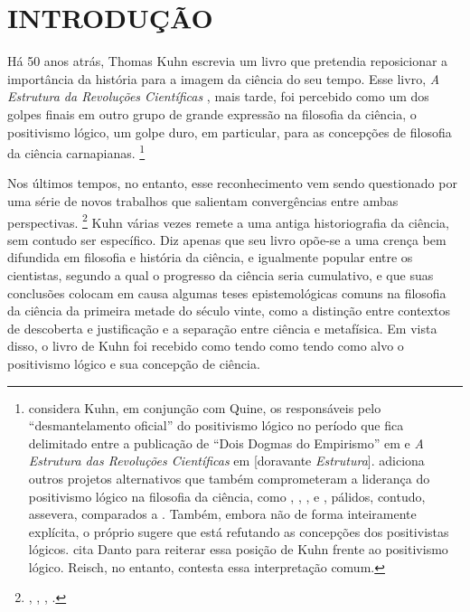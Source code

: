 \setcounter{page}{9}

\chapter{INTRODUÇÃO}
\label{introducao}
\thispagestyle{empty}

Há 50 anos atrás, Thomas Kuhn escrevia um livro que pretendia reposicionar a importância da história para a imagem da ciência do seu tempo. 
Esse livro, \emph{A Estrutura da Revoluções Científicas} \citeyearpar{KUHN1962}, mais tarde, foi percebido como um dos golpes 
finais em outro grupo de grande expressão na filosofia da ciência, o positivismo lógico, um golpe duro, em particular, para as concepções de filosofia da ciência carnapianas.%
    \footnote{\citet[§ 1]{FRIEDMAN1999} considera Kuhn, em conjunção com Quine, os responsáveis pelo ``desmantelamento oficial'' do positivismo lógico
     no período que fica delimitado entre a publicação de ``Dois Dogmas do Empirismo'' em \citeyearpar{QUINE1951} e
      \emph{A Estrutura das Revoluções Científicas} em \citeyearpar{KUHN1962} [doravante \emph{Estrutura}].
       \citet[p. 347]{RICHARDSON2007b} adiciona outros projetos alternativos que também comprometeram a liderança do positivismo 
       lógico na filosofia da ciência, como \citet{POPPER1959}, \citet{SELLARS1963}, \citet{POLANYI1958}, \citet{HANSON1958} e \citet{SUPPE1977}, pálidos, 
       contudo, assevera, comparados a \citet{KUHN2006}. Também, embora não de forma inteiramente explícita, o próprio \citet[p. 27]{KUHN2009} 
       sugere que está refutando as concepções dos positivistas lógicos. \citet[p. 264]{REISCH1991} cita Danto \citeyearpar{DANTO1985} para 
       reiterar essa posição de Kuhn frente ao positivismo lógico. Reisch, no entanto, contesta essa interpretação comum.}

Nos últimos tempos, no entanto, esse reconhecimento vem sendo questionado por uma série de novos trabalhos que salientam convergências entre ambas perspectivas.%
    \footnote{\citet{FRIEDMAN2002}, \citet{REISCH1991}, \citet{EARMAN1993}, \citet{IRZIK1995}.}
Kuhn várias vezes remete a uma antiga historiografia da ciência, sem contudo ser específico. Diz apenas que seu livro opõe-se a uma crença bem difundida em filosofia e história da ciência, e igualmente popular entre os cientistas,  segundo a qual o progresso da ciência seria cumulativo, e que  suas conclusões colocam em causa algumas teses epistemológicas comuns na filosofia da ciência da primeira metade do século vinte, como a distinção entre contextos de descoberta e justificação e a separação entre ciência e metafísica. Em vista disso, o livro de Kuhn foi recebido como tendo como tendo como alvo o positivismo lógico e sua concepção de ciência. 

